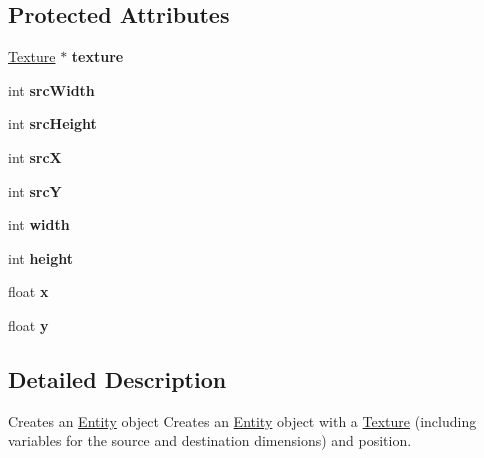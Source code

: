 \subsection*{Protected Attributes}
\begin{DoxyCompactItemize}
\item 
\hypertarget{class_entity_a94c6b2b4a46ea4885b5fa5859d7d68e7}{\hyperlink{class_texture}{Texture} $\ast$ {\bfseries texture}}\label{class_entity_a94c6b2b4a46ea4885b5fa5859d7d68e7}

\item 
\hypertarget{class_entity_a8a44ea56b660b9ac701d32931a066dce}{int {\bfseries src\+Width}}\label{class_entity_a8a44ea56b660b9ac701d32931a066dce}

\item 
\hypertarget{class_entity_a98172dbf203df1a9a7279a5e005eae08}{int {\bfseries src\+Height}}\label{class_entity_a98172dbf203df1a9a7279a5e005eae08}

\item 
\hypertarget{class_entity_a2871ef137e228ba7d431d5c65abcfd5c}{int {\bfseries src\+X}}\label{class_entity_a2871ef137e228ba7d431d5c65abcfd5c}

\item 
\hypertarget{class_entity_a24a5a921e7adf221357a6afd5ce5ec75}{int {\bfseries src\+Y}}\label{class_entity_a24a5a921e7adf221357a6afd5ce5ec75}

\item 
\hypertarget{class_entity_a58bf3e06b7431307e26c4adccae8cf11}{int {\bfseries width}}\label{class_entity_a58bf3e06b7431307e26c4adccae8cf11}

\item 
\hypertarget{class_entity_a5591f1e3ea630c4d8063038728587ab8}{int {\bfseries height}}\label{class_entity_a5591f1e3ea630c4d8063038728587ab8}

\item 
\hypertarget{class_entity_abc2d19ee6ff26b8520428894da6a8f68}{float {\bfseries x}}\label{class_entity_abc2d19ee6ff26b8520428894da6a8f68}

\item 
\hypertarget{class_entity_af4966f81d91cc8f8d5eb9e9002240c49}{float {\bfseries y}}\label{class_entity_af4966f81d91cc8f8d5eb9e9002240c49}

\end{DoxyCompactItemize}


\subsection{Detailed Description}
Creates an \hyperlink{class_entity}{Entity} object Creates an \hyperlink{class_entity}{Entity} object with a \hyperlink{class_texture}{Texture} (including variables for the source and destination dimensions) and position. 

